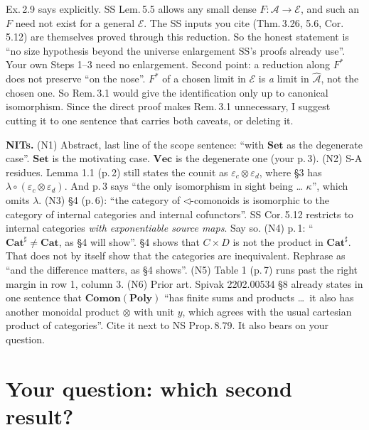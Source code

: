 \documentclass[10pt]{amsart}
\newcommand{\tri}{\mathbin{\triangleleft}}
\newcommand{\Poly}{\mathbf{Poly}}
\newcommand{\Cat}{\mathbf{Cat}}
\newcommand{\Set}{\mathbf{Set}}
\newcommand{\Vect}{\mathbf{Vec}}
\newcommand{\Comon}{\mathbf{Comon}}
\newcommand{\E}{\mathcal{E}}
\begin{document}
\begin{enumerate}[label=\textbf{R3-\Alph*.},leftmargin=*]
  Ex.\,2.9 says explicitly. SS Lem.\,5.5 allows any small dense $F\colon\mathcal A\to\E$, and such an $F$ need not
  exist for a general $\E$. The SS inputs you cite (Thm.\,3.26, 5.6, Cor.\,5.12) are themselves proved through this
  reduction. So the honest statement is ``no size hypothesis beyond the universe enlargement SS's proofs already
  use''. Your own Steps 1--3 need no enlargement. Second point: a reduction along $F^*$ does not preserve ``on the
  nose''. $F^*$ of a chosen limit in $\E$ is \emph{a} limit in $\widehat{\mathcal A}$, not the chosen one. So Rem.\,3.1
  would give the identification only up to canonical isomorphism. Since the direct proof makes Rem.\,3.1
  unnecessary, I suggest cutting it to one sentence that carries both caveats, or deleting it.
\end{enumerate}

\textbf{NITs.}
(N1) Abstract, last line of the scope sentence: ``with $\Set$ as the degenerate case''. $\Set$ is the motivating
case. $\Vect$ is the degenerate one (your p.\,3).
(N2) S-A residues. Lemma 1.1 (p.\,2) still states the counit as $\varepsilon_c\otimes\varepsilon_d$, where \S3 has
$\lambda\circ(\varepsilon_c\otimes\varepsilon_d)$. And p.\,3 says ``the only isomorphism in sight being \dots
$\kappa$'', which omits $\lambda$.
(N3) \S4 (p.\,6): ``the category of $\tri$-comonoids is isomorphic to the category of internal categories and internal
cofunctors''. SS Cor.\,5.12 restricts to internal categories \emph{with exponentiable source maps}. Say so.
(N4) p.\,1: ``$\Cat^\sharp\ne\Cat$, as \S4 will show''. \S4 shows that $C\times D$ is not the product in
$\Cat^\sharp$. That does not by itself show that the categories are inequivalent. Rephrase as ``and the difference
matters, as \S4 shows''.
(N5) Table 1 (p.\,7) runs past the right margin in row 1, column 3.
(N6) Prior art. Spivak 2202.00534 \S8 already states in one sentence that $\Comon(\Poly)$ ``has finite sums and
products \dots\ it also has another monoidal product $\otimes$ with unit $y$, which agrees with the usual cartesian
product of categories''. Cite it next to NS Prop.\,8.79. It also bears on your question.

\section{Your question: which second result?}
\end{document}
